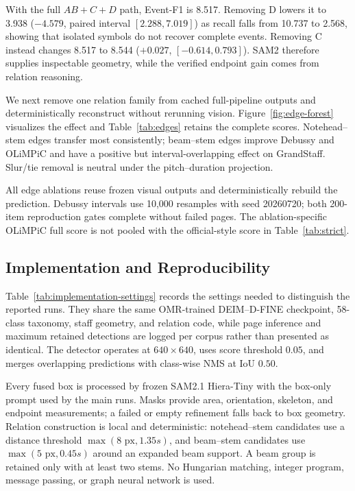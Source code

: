 

With the full $AB{+}C{+}D$ path, Event-F1 is 8.517. Removing D lowers it to 3.938 ($-4.579$, paired interval $[2.288,7.019]$) as recall falls from 10.737 to 2.568, showing that isolated symbols do not recover complete events. Removing C instead changes 8.517 to 8.544 ($+0.027$, $[-0.614,0.793]$). SAM2 therefore supplies inspectable geometry, while the verified endpoint gain comes from relation reasoning.

We next remove one relation family from cached full-pipeline outputs and deterministically reconstruct without rerunning vision. Figure~\ref{fig:edge-forest} visualizes the effect and Table~\ref{tab:edges} retains the complete scores. Notehead--stem edges transfer most consistently; beam--stem edges improve Debussy and OLiMPiC and have a positive but interval-overlapping effect on GrandStaff. Slur/tie removal is neutral under the pitch--duration projection.
\label{sec:relations}





All edge ablations reuse frozen visual outputs and deterministically rebuild the prediction. Debussy intervals use 10,000 resamples with seed 20260720; both 200-item reproduction gates complete without failed pages. The ablation-specific OLiMPiC full score is not pooled with the official-style score in Table~\ref{tab:strict}.

\subsection{Implementation and Reproducibility}
Table~\ref{tab:implementation-settings} records the settings needed to distinguish the reported runs. They share the same OMR-trained DEIM--D-FINE checkpoint, 58-class taxonomy, staff geometry, and relation code, while page inference and maximum retained detections are logged per corpus rather than presented as identical. The detector operates at $640\!\times\!640$, uses score threshold $0.05$, and merges overlapping predictions with class-wise NMS at IoU $0.50$.



Every fused box is processed by frozen SAM2.1 Hiera-Tiny with the box-only prompt used by the main runs. Masks provide area, orientation, skeleton, and endpoint measurements; a failed or empty refinement falls back to box geometry. Relation construction is local and deterministic: notehead--stem candidates use a distance threshold $\max(8\text{ px},1.35s)$, and beam--stem candidates use $\max(5\text{ px},0.45s)$ around an expanded beam support. A beam group is retained only with at least two stems. No Hungarian matching, integer program, message passing, or graph neural network is used.

